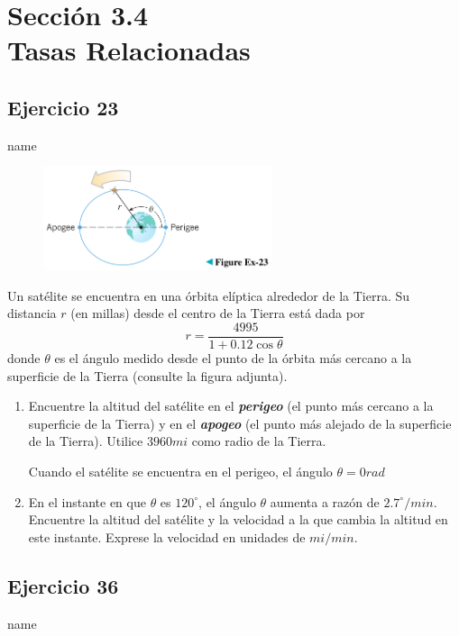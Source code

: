 \documentclass[12pt]{article}
\begin{document}
\section{Sección 3.4 \\ Tasas Relacionadas} 
\subsection{Ejercicio 23} name \\

\begin{figure}[H]
\centering
\includegraphics[width=0.6\textwidth]{../img/img_Lista3/23.png}
\end{figure}
Un satélite se encuentra en una órbita elíptica alrededor de la Tierra. Su distancia $r$ (en millas) desde el centro de la Tierra está dada por
\[
r=\frac{4995}{1+0.12\cos{\theta}}
\]
donde $\theta$ es el ángulo medido desde el punto de la órbita más cercano a la superficie de la Tierra (consulte la figura adjunta).
\begin{enumerate}
\item Encuentre la altitud del satélite en el \textit{\textbf{perigeo}} (el punto más cercano a la superficie de la Tierra) y en el \textit{\textbf{apogeo}} (el punto más alejado de la superficie de la Tierra). Utilice $3960 mi$ como radio de la Tierra.

  Cuando el satélite se encuentra en el perigeo, el ángulo $\theta=0 rad$
  
\item En el instante en que $\theta$ es $120^{\circ}$, el ángulo $\theta$ aumenta a razón de $2.7^{\circ} /min$. Encuentre la altitud del satélite y la velocidad a la que cambia la altitud en este instante. Exprese la velocidad en unidades de $mi/min$.
\end{enumerate}

\subsection{Ejercicio 36} name \\
\end{document}

